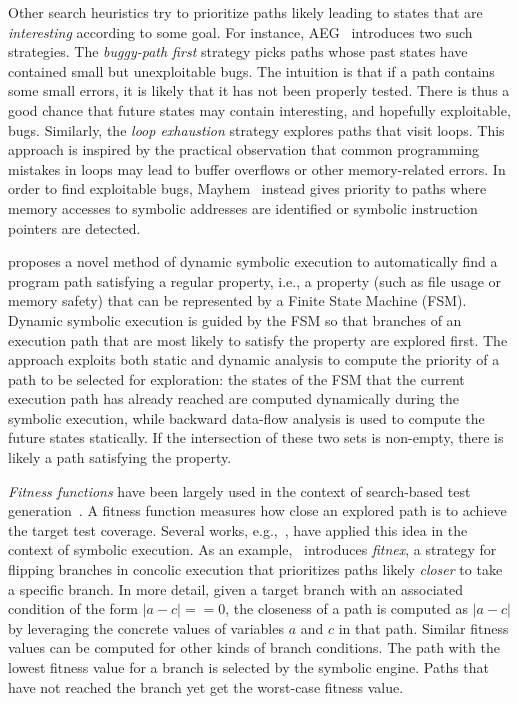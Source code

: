 Other search heuristics try to prioritize paths likely leading to states that are {\em interesting} according to some goal. For instance, {\textsc AEG}~\cite{AEG-NDSS11} introduces two such strategies. The {\em buggy-path first} strategy picks paths whose past states have contained small but unexploitable bugs. The intuition is that if a path contains some small errors, it is likely that it has not been properly tested. There is thus a good chance that future states may contain interesting, and hopefully exploitable, bugs. Similarly, the {\em loop exhaustion} strategy explores paths that visit loops. This approach is inspired by the practical observation that common programming mistakes in loops may lead to buffer overflows or other memory-related errors. In order to find exploitable bugs, {\textsc Mayhem}~\cite{MAYHEM-SP12} instead gives priority to paths where memory accesses to symbolic addresses are identified or symbolic instruction pointers are detected. 

\cite{ZCWDL15} proposes a novel method of dynamic symbolic execution to automatically find a program path satisfying a regular property, i.e., a property (such as file usage or memory safety) that can be represented by a Finite State Machine (FSM). Dynamic symbolic execution is guided by the FSM so that branches of an execution path that are most likely to satisfy the property are explored first. The approach exploits both static and dynamic analysis to compute the priority of a path to be selected for exploration: the states of the FSM that the current execution path has already reached are computed dynamically during the symbolic execution, while backward data-flow analysis is used to compute the future states statically. If the intersection of these two sets is non-empty, there is likely a path satisfying the property.

{\em Fitness functions} have been largely used in the context of search-based test generation~\cite{M-STVR04}. %
A fitness function measures how close an explored path is to achieve the target test coverage. Several works, e.g.,~\cite{XTD-DSN09,CS-CACM13}, have applied this idea in the context of symbolic execution. As an example,~\cite{XTD-DSN09} introduces {\em fitnex}, a strategy for flipping branches in concolic execution that prioritizes paths likely {\em closer} to take a specific branch.
In more detail, given a target branch with an associated condition of the form $|a - c| == 0$, the closeness of a path is computed as $|a - c|$ by leveraging the concrete values of variables $a$ and $c$ in that path. Similar fitness values can be computed for other kinds of branch conditions. The path with the lowest fitness value for a branch is selected by the symbolic engine. Paths that have not reached the branch yet get the worst-case fitness value. 

